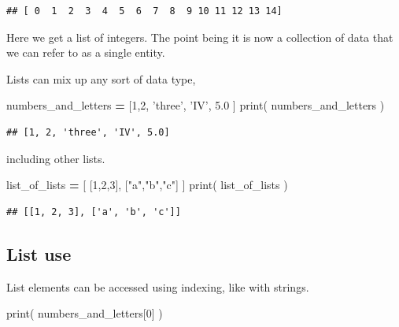 \documentclass[]{book}
\newenvironment{Shaded}{\begin{snugshade}}{\end{snugshade}}
\newcommand{\BuiltInTok}[1]{#1}
\newcommand{\DecValTok}[1]{\textcolor[rgb]{0.00,0.00,0.81}{#1}}
\newcommand{\FloatTok}[1]{\textcolor[rgb]{0.00,0.00,0.81}{#1}}
\newcommand{\NormalTok}[1]{#1}
\newcommand{\OperatorTok}[1]{\textcolor[rgb]{0.81,0.36,0.00}{\textbf{#1}}}
\newcommand{\StringTok}[1]{\textcolor[rgb]{0.31,0.60,0.02}{#1}}
\theoremstyle{definition}
\theoremstyle{definition}
\theoremstyle{definition}
\theoremstyle{remark}
\begin{document}
\begin{verbatim}
## [ 0  1  2  3  4  5  6  7  8  9 10 11 12 13 14]
\end{verbatim}

Here we get a list of integers. The point being it is now a collection
of data that we can refer to as a single entity.

Lists can mix up any sort of data type,

\begin{Shaded}
\begin{Highlighting}[]
\NormalTok{numbers_and_letters }\OperatorTok{=}\NormalTok{ [}\DecValTok{1}\NormalTok{,}\DecValTok{2}\NormalTok{, }\StringTok{'three'}\NormalTok{, }\StringTok{'IV'}\NormalTok{, }\FloatTok{5.0}\NormalTok{ ]}
\BuiltInTok{print}\NormalTok{( numbers_and_letters )}
\end{Highlighting}
\end{Shaded}

\begin{verbatim}
## [1, 2, 'three', 'IV', 5.0]
\end{verbatim}

including other lists.

\begin{Shaded}
\begin{Highlighting}[]
\NormalTok{list_of_lists }\OperatorTok{=}\NormalTok{ [ [}\DecValTok{1}\NormalTok{,}\DecValTok{2}\NormalTok{,}\DecValTok{3}\NormalTok{], [}\StringTok{"a"}\NormalTok{,}\StringTok{"b"}\NormalTok{,}\StringTok{"c"}\NormalTok{] ]}
\BuiltInTok{print}\NormalTok{( list_of_lists )}
\end{Highlighting}
\end{Shaded}

\begin{verbatim}
## [[1, 2, 3], ['a', 'b', 'c']]
\end{verbatim}

\hypertarget{list-use}{%
\subsection{List use}\label{list-use}}

List elements can be accessed using indexing, like with strings.

\begin{Shaded}
\begin{Highlighting}[]
\BuiltInTok{print}\NormalTok{( numbers_and_letters[}\DecValTok{0}\NormalTok{] )}
\end{Highlighting}
\end{Shaded}
\end{document}
